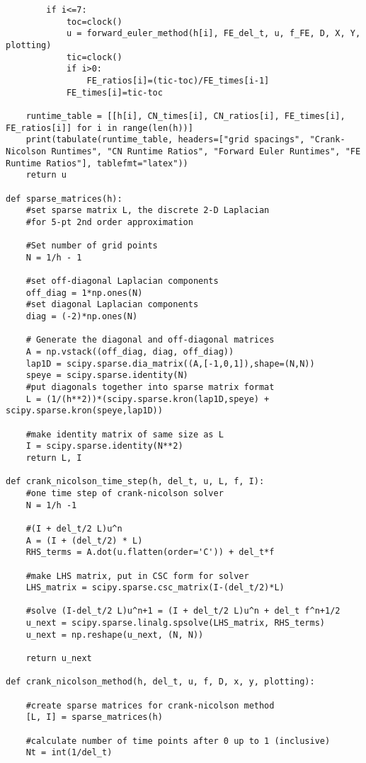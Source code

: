 \documentclass[12pt]{article}
\begin{document}
\begin{verbatim}
        if i<=7:
            toc=clock()
            u = forward_euler_method(h[i], FE_del_t, u, f_FE, D, X, Y, plotting)
            tic=clock()
            if i>0:
                FE_ratios[i]=(tic-toc)/FE_times[i-1]
            FE_times[i]=tic-toc

    runtime_table = [[h[i], CN_times[i], CN_ratios[i], FE_times[i], FE_ratios[i]] for i in range(len(h))]
    print(tabulate(runtime_table, headers=["grid spacings", "Crank-Nicolson Runtimes", "CN Runtime Ratios", "Forward Euler Runtimes", "FE Runtime Ratios"], tablefmt="latex"))
    return u    

def sparse_matrices(h):
    #set sparse matrix L, the discrete 2-D Laplacian
    #for 5-pt 2nd order approximation

    #Set number of grid points
    N = 1/h - 1

    #set off-diagonal Laplacian components
    off_diag = 1*np.ones(N)
    #set diagonal Laplacian components
    diag = (-2)*np.ones(N)

    # Generate the diagonal and off-diagonal matrices
    A = np.vstack((off_diag, diag, off_diag))
    lap1D = scipy.sparse.dia_matrix((A,[-1,0,1]),shape=(N,N))
    speye = scipy.sparse.identity(N)
    #put diagonals together into sparse matrix format
    L = (1/(h**2))*(scipy.sparse.kron(lap1D,speye) + scipy.sparse.kron(speye,lap1D))

    #make identity matrix of same size as L
    I = scipy.sparse.identity(N**2)
    return L, I

def crank_nicolson_time_step(h, del_t, u, L, f, I):
    #one time step of crank-nicolson solver
    N = 1/h -1

    #(I + del_t/2 L)u^n
    A = (I + (del_t/2) * L)
    RHS_terms = A.dot(u.flatten(order='C')) + del_t*f

    #make LHS matrix, put in CSC form for solver
    LHS_matrix = scipy.sparse.csc_matrix(I-(del_t/2)*L)

    #solve (I-del_t/2 L)u^n+1 = (I + del_t/2 L)u^n + del_t f^n+1/2
    u_next = scipy.sparse.linalg.spsolve(LHS_matrix, RHS_terms)
    u_next = np.reshape(u_next, (N, N))

    return u_next

def crank_nicolson_method(h, del_t, u, f, D, x, y, plotting):

    #create sparse matrices for crank-nicolson method
    [L, I] = sparse_matrices(h)

    #calculate number of time points after 0 up to 1 (inclusive)
    Nt = int(1/del_t)


\end{verbatim}
\end{document}
